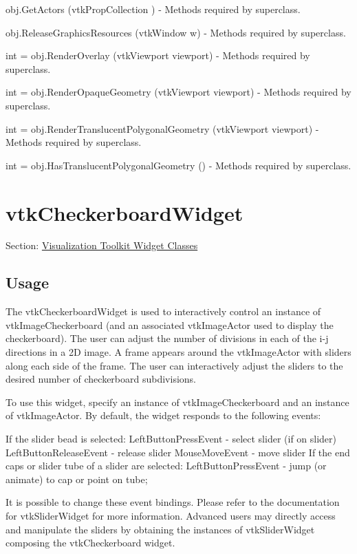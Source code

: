 \begin{DoxyItemize}
\item {\ttfamily obj.\-Get\-Actors (vtk\-Prop\-Collection )} -\/ Methods required by superclass.  
\item {\ttfamily obj.\-Release\-Graphics\-Resources (vtk\-Window w)} -\/ Methods required by superclass.  
\item {\ttfamily int = obj.\-Render\-Overlay (vtk\-Viewport viewport)} -\/ Methods required by superclass.  
\item {\ttfamily int = obj.\-Render\-Opaque\-Geometry (vtk\-Viewport viewport)} -\/ Methods required by superclass.  
\item {\ttfamily int = obj.\-Render\-Translucent\-Polygonal\-Geometry (vtk\-Viewport viewport)} -\/ Methods required by superclass.  
\item {\ttfamily int = obj.\-Has\-Translucent\-Polygonal\-Geometry ()} -\/ Methods required by superclass.  
\end{DoxyItemize}\hypertarget{vtkwidgets_vtkcheckerboardwidget}{}\section{vtk\-Checkerboard\-Widget}\label{vtkwidgets_vtkcheckerboardwidget}
Section\-: \hyperlink{sec_vtkwidgets}{Visualization Toolkit Widget Classes} \hypertarget{vtkwidgets_vtkxyplotwidget_Usage}{}\subsection{Usage}\label{vtkwidgets_vtkxyplotwidget_Usage}
The vtk\-Checkerboard\-Widget is used to interactively control an instance of vtk\-Image\-Checkerboard (and an associated vtk\-Image\-Actor used to display the checkerboard). The user can adjust the number of divisions in each of the i-\/j directions in a 2\-D image. A frame appears around the vtk\-Image\-Actor with sliders along each side of the frame. The user can interactively adjust the sliders to the desired number of checkerboard subdivisions.

To use this widget, specify an instance of vtk\-Image\-Checkerboard and an instance of vtk\-Image\-Actor. By default, the widget responds to the following events\-: 
\begin{DoxyPre}
 If the slider bead is selected:
   LeftButtonPressEvent - select slider (if on slider)
   LeftButtonReleaseEvent - release slider 
   MouseMoveEvent - move slider
 If the end caps or slider tube of a slider are selected:
   LeftButtonPressEvent - jump (or animate) to cap or point on tube;
 \end{DoxyPre}
 It is possible to change these event bindings. Please refer to the documentation for vtk\-Slider\-Widget for more information. Advanced users may directly access and manipulate the sliders by obtaining the instances of vtk\-Slider\-Widget composing the vtk\-Checkerboard widget.

